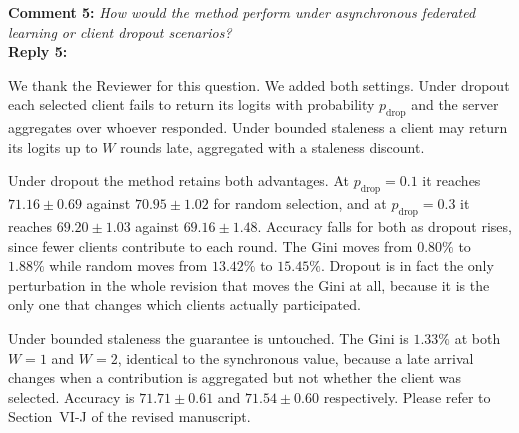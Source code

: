 \documentclass[10pt]{article}
\begin{document}
\noindent
\textbf{Comment 5:} \textit{How would the method perform under asynchronous federated learning or client dropout scenarios?} \\
\noindent
\textbf{Reply 5:} {We thank the Reviewer for this question. We added both settings. Under dropout each selected client fails to return its logits with probability $p_{\text{drop}}$ and the server aggregates over whoever responded. Under bounded staleness a client may return its logits up to $W$ rounds late, aggregated with a staleness discount.

Under dropout the method retains both advantages. At $p_{\text{drop}} = 0.1$ it reaches $71.16 \pm 0.69$ against $70.95 \pm 1.02$ for random selection, and at $p_{\text{drop}} = 0.3$ it reaches $69.20 \pm 1.03$ against $69.16 \pm 1.48$. Accuracy falls for both as dropout rises, since fewer clients contribute to each round. The Gini moves from $0.80\%$ to $1.88\%$ while random moves from $13.42\%$ to $15.45\%$. Dropout is in fact the only perturbation in the whole revision that moves the Gini at all, because it is the only one that changes which clients actually participated.

Under bounded staleness the guarantee is untouched. The Gini is $1.33\%$ at both $W = 1$ and $W = 2$, identical to the synchronous value, because a late arrival changes when a contribution is aggregated but not whether the client was selected. Accuracy is $71.71 \pm 0.61$ and $71.54 \pm 0.60$ respectively. Please refer to Section~VI-J of the revised manuscript.}\\
\end{document}
